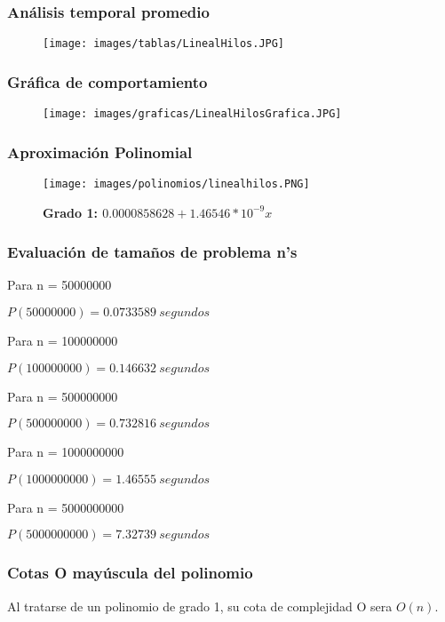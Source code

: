 \documentclass[12pt]{article}
\begin{document}
			\subsubsection{Análisis temporal promedio}
				\begin{figure}[H]
				    \centering
			    	   \texttt{[image: images/tablas/LinealHilos.JPG]}
			    \end{figure}
			
			\subsubsection{Gráfica de comportamiento}
				\begin{figure}[H]
				    \centering
			    	   \texttt{[image: images/graficas/LinealHilosGrafica.JPG]}
			    \end{figure}
			
			\subsubsection{Aproximación Polinomial}
			\begin{figure}[H]
    			  \centering
    			 \texttt{[image: images/polinomios/linealhilos.PNG]}
    			    	   \caption*{\textbf{Grado 1: $0.0000858628 + 1.46546*10^{-9} x$}}
    			  \end{figure}
			
			\newpage
			\subsubsection{Evaluación de tamaños de problema n's}
			Para n = 50000000
    			
                $P(50000000) = 0.0733589~ segundos$
    
    			Para n = 100000000
    			
    			$P(100000000) = 0.146632~ segundos$
    			
    			Para n = 500000000
    			
    			$P(500000000) = 0.732816~ segundos$
    			
    			Para n = 1000000000
    			
    			$P(1000000000) = 1.46555~ segundos$
    			
    			Para n = 5000000000
    			
    			$P(5000000000) = 7.32739~ segundos$
			
		\subsubsection{Cotas O mayúscula del polinomio}
		Al tratarse de un polinomio de grado 1, su cota de complejidad O sera $O(n)$.
			
\end{document}
